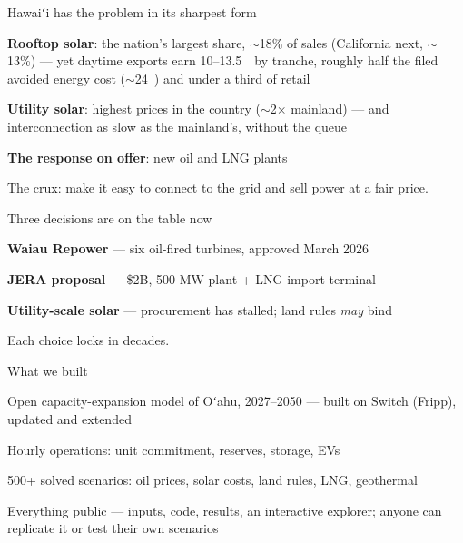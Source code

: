 \documentclass[11pt,aspectratio=169]{beamer}
\begin{document}
\begin{frame}{Hawaiʻi has the problem in its sharpest form}
\begin{wideitemize}
  \item \textbf{Rooftop solar}: the nation's largest share, $\sim$18\% of
        sales (California next, $\sim$13\%) --- yet daytime exports earn
        10--13.5~\textcent\ by tranche, roughly half the filed avoided
        energy cost ($\sim$24~\textcent) and under a third of retail
  \item \textbf{Utility solar}: highest prices in the country
        ($\sim$2$\times$ mainland) --- and interconnection as slow as the
        mainland's, without the queue
  \item \textbf{The response on offer}: new oil and LNG plants
\end{wideitemize}
\vspace{0.4cm}
\begin{center}
  {\Large \textcolor{uhgreen}{The crux: make it easy to connect to the
   grid and sell power at a fair price.}}
\end{center}
\end{frame}

\begin{frame}{Three decisions are on the table now}
\begin{wideitemize}
  \item \textbf{Waiau Repower} — six oil-fired turbines, approved March 2026
  \item \textbf{JERA proposal} — \$2B, 500 MW plant + LNG import terminal
  \item \textbf{Utility-scale solar} — procurement has stalled; land rules
        \emph{may} bind
\end{wideitemize}
\vspace{0.4cm}
Each choice locks in decades.
\end{frame}

\begin{frame}{What we built}
\begin{wideitemize}
  \item Open capacity-expansion model of Oʻahu, 2027--2050 --- built on
        Switch (Fripp), updated and extended
  \item Hourly operations: unit commitment, reserves, storage, EVs
  \item 500+ solved scenarios: oil prices, solar costs, land rules,
        LNG, geothermal
  \item Everything public --- inputs, code, results, an interactive
        explorer; anyone can replicate it or test their own scenarios
\end{wideitemize}
\end{frame}
\end{document}
